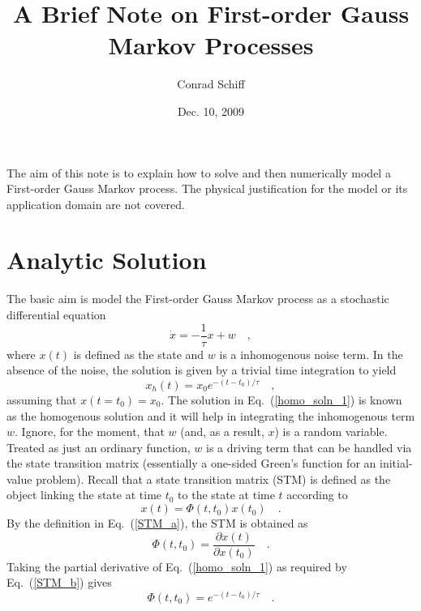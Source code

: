 \documentclass[10pt]{article}
\begin{document}
\title{A Brief Note on First-order Gauss Markov Processes}
\author{Conrad Schiff}
\date{Dec. 10, 2009}
\maketitle

The aim of this note is to explain how to solve and then numerically
model a First-order Gauss Markov process.  The physical justification
for the model or its application domain are not covered.

\section{Analytic Solution}

The basic aim is model the First-order Gauss Markov process as a
stochastic differential equation
\begin{equation}\label{SDE_1}
   {\dot x} = -\frac{1}{\tau} x + w \quad ,
\end{equation}
where $x(t)$ is defined as the state and $w$ is a inhomogenous
noise term.  In the absence of the noise, the solution is given
by a trivial time integration to yield
\begin{equation}\label{homo_soln_1}
   x_{h}(t) = x_{0} e^{ -(t-t_{0})/\tau } \quad ,
\end{equation}
assuming that $x(t=t_{0}) = x_{0}$.  The solution in Eq.\ (\ref{homo_soln_1}) 
is known as the homogenous solution and it will help in integrating the 
inhomogenous term $w$.  Ignore, for the moment, that $w$ (and, as a result, $x$)
is a random variable.  Treated as just an ordinary function, $w$ is a driving term
that can be handled via the state transition matrix (essentially a one-sided 
Green's function for an initial-value problem).  Recall that a state transition
matrix (STM) is defined as the object linking the state at time $t_{0}$ to the
state at time $t$ according to
\begin{equation}\label{STM_a}
   x(t) = \Phi(t,t_{0}) x(t_{0}) \quad .
\end{equation}
By the definition in Eq.\ (\ref{STM_a}), the STM is obtained as
\begin{equation}\label{STM_b}
   \Phi(t,t_{0}) = \frac{\partial x(t)}{\partial x(t_{0})} \quad .
\end{equation}
Taking the partial derivative of Eq.\ (\ref{homo_soln_1}) as required
by Eq.\ (\ref{STM_b}) gives 
\begin{equation}\label{STM_c}
   \Phi(t,t_{0}) = e^{ -(t-t_{0})/\tau } \quad .
\end{equation}
\end{document}
